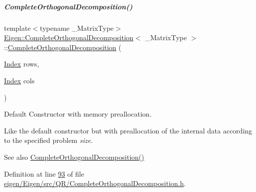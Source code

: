 \mbox{\label{group___q_r___module_aa6c282dd7452ebe754024edb71bebd09}} 
\subparagraph{\texorpdfstring{Complete\+Orthogonal\+Decomposition()}{CompleteOrthogonalDecomposition()}\hspace{0.1cm}{\footnotesize\ttfamily [2/8]}}
{\footnotesize\ttfamily template$<$typename \+\_\+\+Matrix\+Type$>$ \\
\hyperlink{group___q_r___module_class_eigen_1_1_complete_orthogonal_decomposition}{Eigen\+::\+Complete\+Orthogonal\+Decomposition}$<$ \+\_\+\+Matrix\+Type $>$\+::\hyperlink{group___q_r___module_class_eigen_1_1_complete_orthogonal_decomposition}{Complete\+Orthogonal\+Decomposition} (\begin{DoxyParamCaption}\item[{\hyperlink{namespace_eigen_a62e77e0933482dafde8fe197d9a2cfde}{Index}}]{rows,  }\item[{\hyperlink{namespace_eigen_a62e77e0933482dafde8fe197d9a2cfde}{Index}}]{cols }\end{DoxyParamCaption})\hspace{0.3cm}{\ttfamily [inline]}}



Default Constructor with memory preallocation. 

Like the default constructor but with preallocation of the internal data according to the specified problem {\itshape size}. \begin{DoxySeeAlso}{See also}
\hyperlink{group___q_r___module_a7ba33814fd3fdc62f6179cdcd655c679}{Complete\+Orthogonal\+Decomposition()} 
\end{DoxySeeAlso}


Definition at line \hyperlink{eigen_2_eigen_2src_2_q_r_2_complete_orthogonal_decomposition_8h_source_l00093}{93} of file \hyperlink{eigen_2_eigen_2src_2_q_r_2_complete_orthogonal_decomposition_8h_source}{eigen/\+Eigen/src/\+Q\+R/\+Complete\+Orthogonal\+Decomposition.\+h}.

